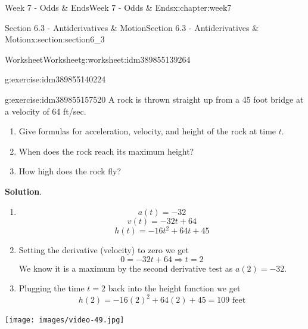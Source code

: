 \documentclass[oneside,10pt,]{book}
\newcommand{\blocktitlefont}{\relax}
\numberwithin{equation}{section}
\newlength{\qrsize}
\newlength{\previewwidth}
\begin{document}
\begin{chapterptx}{Week 7 - Odds \& Ends}{}{Week 7 - Odds \& Ends}{}{}{x:chapter:week7}
\begin{sectionptx}{Section 6.3 - Antiderivatives \& Motion}{}{Section 6.3 - Antiderivatives \& Motion}{}{}{x:section:section6_3}
\begin{worksheet-subsection}{Worksheet}{}{Worksheet}{}{}{g:worksheet:idm389855139264}
\begin{divisionexercise}{1}{}{}{g:exercise:idm389855140224}
\end{divisionexercise}%
\begin{divisionexercise}{2}{}{}{g:exercise:idm389855157520}%
A rock is thrown straight up from a 45 foot bridge at a velocity of 64 ft\slash{}sec.%
%
\begin{enumerate}[label=(\alph*)]
\item{}Give formulas for acceleration, velocity, and height of the rock at time \(t\).%
\item{}When does the rock reach its maximum height?%
\item{}How high does the rock fly?%
\end{enumerate}
\textbf{\blocktitlefont Solution}.\hypertarget{g:solution:idm389855166896}{}\quad{}%
\begin{enumerate}[label=(\alph*)]
\item{}%
\begin{equation*}
a(t) = -32
\end{equation*}
%
\begin{equation*}
v(t) = -32t+64
\end{equation*}
%
\begin{equation*}
h(t) = -16t^2+64t+45
\end{equation*}
%
\item{}Setting the derivative (velocity) to zero we get%
%
\begin{equation*}
0 = -32t+64 \Rightarrow t=2 
\end{equation*}
We know it is a maximum by the second derivative test as \(a(2)=-32\).%
\item{}Plugging the time \(t=2\) back into the height function we get%
\begin{equation*}
h(2) = -16(2)^2+64(2)+45 = 109\text{ feet}
\end{equation*}
%
\end{enumerate}
\end{divisionexercise}%
\end{worksheet-subsection}
\restoregeometry
\setlength{\qrsize}{9em}
\setlength{\previewwidth}{\linewidth}
\addtolength{\previewwidth}{-\qrsize}
\begin{tcbraster}[raster columns=2, raster column skip=1pt, raster halign=center, raster force size=false, raster left skip=0pt, raster right skip=0pt]%
\begin{tcolorbox}[previewstyle, width=\previewwidth]%
\texttt{[image: images/video-49.jpg]}%
\end{tcolorbox}%
\begin{tcolorbox}[qrstyle]%

\end{tcolorbox}
\end{tcbraster}
\end{sectionptx}
\end{chapterptx}
\end{document}
